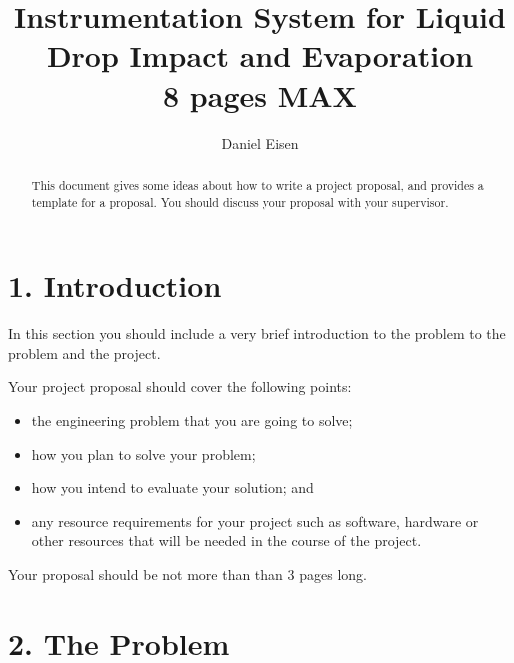 \documentclass[11pt, a4paper, twoside, openright]{report}
\title{Instrumentation System for Liquid Drop Impact and Evaporation \\ 8 pages MAX}
\author{Daniel Eisen}
\date{}
\begin{document}
\frontmatter


\begin{abstract}
  This document gives some ideas about how to write a project
  proposal, and provides a template for a proposal. You should discuss
  your proposal with your supervisor.
\end{abstract}


\maketitle




\mainmatter


\section*{1. Introduction}

In this section you should include a very brief introduction to the problem to the problem and the project.

Your project proposal should cover the following points:

\begin{itemize}
  \item the engineering problem that you are going to solve;
  \item how you plan to solve your problem;
  \item how you intend to evaluate your solution; and
  \item any resource requirements for your project such as software, hardware or other resources that will be needed in the course of the project.
\end{itemize}

Your proposal should be not more than than 3 pages long.

\section*{2. The Problem}
\end{document}
